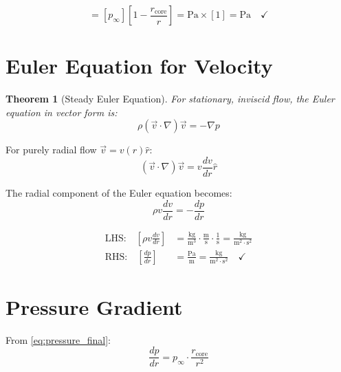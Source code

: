 \documentclass[12pt,a4paper,openany]{book}
\theoremstyle{definition}
\theoremstyle{plain}
\newtheorem{theorem}{Theorem}[chapter]
\theoremstyle{remark}
\newcommand{\rcore}{r_{\text{core}}}       %
\newcommand{\pinfty}{p_\infty}             %
\begin{document}
\begin{dimcheckbox}
\begin{equation}
[p] = [\pinfty]\left[1 - \frac{\rcore}{r}\right] = \text{Pa} \times [1] = \text{Pa} \quad \checkmark
\end{equation}
\end{dimcheckbox}

\section{Euler Equation for Velocity}

\begin{theorem}[Steady Euler Equation]
For stationary, inviscid flow, the Euler equation in vector form is:
\begin{equation}
\rho(\vec{v} \cdot \nabla)\vec{v} = -\nabla p
\label{eq:euler_vector}
\end{equation}
\end{theorem}

For purely radial flow $\vec{v} = v(r)\hat{r}$:
\begin{equation}
(\vec{v} \cdot \nabla)\vec{v} = v\frac{dv}{dr}\hat{r}
\label{eq:convective}
\end{equation}

The radial component of the Euler equation becomes:
\begin{equation}
\rho v \frac{dv}{dr} = -\frac{dp}{dr}
\label{eq:euler_radial}
\end{equation}

\begin{dimcheckbox}
\begin{align}
\text{LHS:} \quad [\rho v \frac{dv}{dr}] &= \frac{\text{kg}}{\text{m}^3} \cdot \frac{\text{m}}{\text{s}} \cdot \frac{1}{\text{s}} = \frac{\text{kg}}{\text{m}^2 \cdot \text{s}^2} \\
\text{RHS:} \quad [\frac{dp}{dr}] &= \frac{\text{Pa}}{\text{m}} = \frac{\text{kg}}{\text{m}^2 \cdot \text{s}^2} \quad \checkmark
\end{align}
\end{dimcheckbox}

\section{Pressure Gradient}

From \cref{eq:pressure_final}:
\begin{equation}
\frac{dp}{dr} = \pinfty \cdot \frac{\rcore}{r^2}
\label{eq:dp_dr}
\end{equation}
\end{document}
